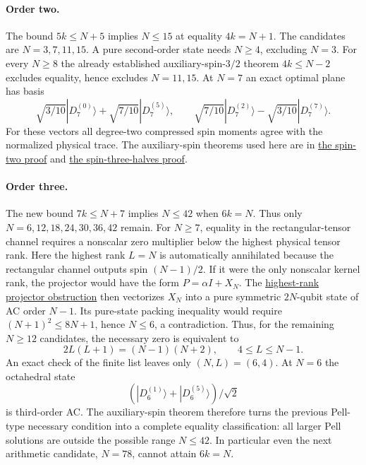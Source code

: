 \documentclass{article}
\begin{document}
\paragraph{Order two.}
The bound $5k\le N+5$ implies $N\le15$ at equality
$4k=N+1$. The candidates are $N=3,7,11,15$.
A pure second-order state needs $N\ge4$, excluding $N=3$.
For every $N\ge8$ the already established auxiliary-spin-$3/2$ theorem
$4k\le N-2$ excludes equality, hence excludes $N=11,15$.
At $N=7$ an exact optimal plane has basis
\[
\sqrt{3/10}|D_7^{(0)}\rangle+\sqrt{7/10}|D_7^{(5)}\rangle,
\qquad
\sqrt{7/10}|D_7^{(2)}\rangle-\sqrt{3/10}|D_7^{(7)}\rangle.
\]
For these vectors all degree-two compressed spin moments agree with the
normalized physical trace. The auxiliary-spin theorems used here are in
\href{../t2-spin2-inertia/proof.tex}{the spin-two proof} and
\href{../ancilla-inertia/proof.tex}{the spin-three-halves proof}.

\paragraph{Order three.}
The new bound $7k\le N+7$ implies $N\le42$ when $6k=N$.
Thus only $N=6,12,18,24,30,36,42$ remain.
For $N\ge7$, equality in the rectangular-tensor channel requires a
nonscalar zero multiplier below the highest physical tensor rank.
Here the highest rank $L=N$ is automatically annihilated because the
rectangular channel outputs spin $(N-1)/2$. If it were the only
nonscalar kernel rank, the projector would have the form
$P=\alpha I+X_N$. The
\href{../general-bounds/proof.tex}{highest-rank projector obstruction}
then vectorizes $X_N$ into a pure symmetric $2N$-qubit state of AC
order $N-1$. Its pure-state packing inequality would require
$(N+1)^2\le8N+1$, hence $N\le6$, a contradiction.
Thus, for the remaining $N\ge12$ candidates, the necessary zero is
equivalent to
\[
2L(L+1)=(N-1)(N+2),\qquad 4\le L\le N-1.
\]
An exact check of the finite list leaves only $(N,L)=(6,4)$.
At $N=6$ the octahedral state
\[
(|D_6^{(1)}\rangle+|D_6^{(5)}\rangle)/\sqrt2
\]
is third-order AC. The auxiliary-spin theorem therefore turns the
previous Pell-type necessary condition into a complete equality
classification: all larger Pell solutions are outside the possible
range $N\le42$. In particular even the next arithmetic candidate,
$N=78$, cannot attain $6k=N$.
\end{document}
